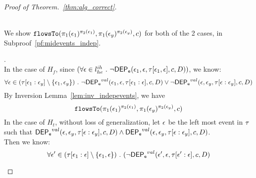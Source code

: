 \begin{proof}[Proof of Theorem.~\ref{thm:alg_correct}]
\begin{case}
\begin{subcase}
\begin{subsubcase}
\\
We show $\mathtt{flowsTo}(\pi_1(\mathtt{\epsilon}_1)^{\pi_2(\mathtt{\epsilon}_1)}, \pi_1(\mathtt{\epsilon}_y)^{\pi_2(\mathtt{\epsilon}_y)}, c)$ for both of the 2 cases,
 in Subproof~\ref{pf:midevents_indep}.
%
\begin{subproof}.
  \label{pf:midevents_indep}
  \\
  In the case of $H_f$, since $(\forall \mathtt{\epsilon} \in l^{ih}_{he} ~.~ \neg \mathsf{DEP_{\mathtt{e}}}(\mathtt{\epsilon}_1, \mathtt{\epsilon}, \mathtt{\tau}[\mathtt{\epsilon}_1, \mathtt{\epsilon}], c, D))$,
  we know:
  \[
      \forall \mathtt{\epsilon} \in (\mathtt{\tau}[\mathtt{\epsilon}_1:\mathtt{\epsilon}_y]\setminus \{\mathtt{\epsilon}_1, \mathtt{\epsilon}_y\}) ~.~
      \neg \mathsf{DEP_{\mathtt{e}}}^{val} (\mathtt{\epsilon}_1, \mathtt{\epsilon}, \mathtt{\tau}[\mathtt{\epsilon}_1: \mathtt{\epsilon}], c, D) 
      \lor \neg \mathsf{DEP_{\mathtt{e}}}^{val} (\mathtt{\epsilon}, \mathtt{\epsilon}_y,\mathtt{\tau}[\mathtt{\epsilon}:\mathtt{\epsilon}_y], c, D)
    \]
    By Inversion Lemma~\ref{lem:inv_indepevents}, we have
    \[
      \mathtt{flowsTo}(\pi_1(\mathtt{\epsilon}_1)^{\pi_2(\mathtt{\epsilon}_1)}, \pi_1(\mathtt{\epsilon}_y)^{\pi_2(\mathtt{\epsilon}_y)}, c)
    \]
  In the case of $H_t$, without loss of generalization, let $\mathtt{\epsilon}$ be the left most event in $\mathtt{\tau}$ such that 
  $\mathsf{DEP_{\mathtt{e}}}^{val} (\mathtt{\epsilon}, \mathtt{\epsilon}_y, \mathtt{\tau}[\mathtt{\epsilon}:\mathtt{\epsilon}_y], c, D) \land \mathsf{DEP_{\mathtt{e}}}^{val} (\mathtt{\epsilon}, \mathtt{\epsilon}_y, \mathtt{\tau}[\mathtt{\epsilon}:\mathtt{\epsilon}_y], c, D)$.
  \\
 Then we know:
  \[
    \forall \mathtt{\epsilon}' \in (\mathtt{\tau}[\mathtt{\epsilon}_1:\mathtt{\epsilon}]\setminus \{\mathtt{\epsilon}_1, \mathtt{\epsilon}\}) 
    ~.~ 
    (\neg \mathsf{DEP_{\mathtt{e}}}^{val} (\mathtt{\epsilon}', \mathtt{\epsilon}, \mathtt{\tau}[\mathtt{\epsilon}':\mathtt{\epsilon}], c, D)
\]
\end{subproof}
\end{subsubcase}
\end{subcase}
\end{case}
\end{proof}
